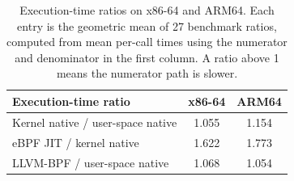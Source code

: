 \begin{table}[t]
\centering
\small
\caption{Execution-time ratios on x86-64 and ARM64. Each entry is the geometric mean of 27 benchmark ratios, computed from mean per-call times using the numerator and denominator in the first column. A ratio above 1 means the numerator path is slower.}
\label{tab:char-micro-summary}
\begin{tabular}{@{}lcc@{}}
\toprule
\textbf{Execution-time ratio} & \textbf{x86-64} & \textbf{ARM64} \\
\midrule
Kernel native / user-space native & 1.055 & 1.154 \\
\addlinespace
eBPF JIT / kernel native & 1.622 & 1.773 \\
\addlinespace
LLVM-BPF / user-space native & 1.068 & 1.054 \\
\bottomrule
\end{tabular}
\end{table}
